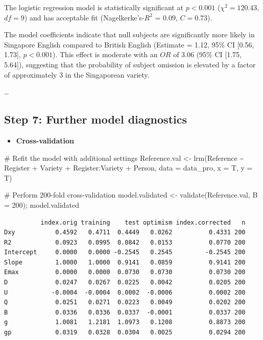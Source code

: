 \documentclass[
  11pt,
  letterpaper,
  DIV=11,
  numbers=noendperiod]{scrreprt}
\newenvironment{Shaded}{\begin{snugshade}}{\end{snugshade}}
\newcommand{\AttributeTok}[1]{\textcolor[rgb]{0.40,0.45,0.13}{#1}}
\newcommand{\CommentTok}[1]{\textcolor[rgb]{0.37,0.37,0.37}{#1}}
\newcommand{\DecValTok}[1]{\textcolor[rgb]{0.68,0.00,0.00}{#1}}
\newcommand{\FunctionTok}[1]{\textcolor[rgb]{0.28,0.35,0.67}{#1}}
\newcommand{\NormalTok}[1]{\textcolor[rgb]{0.00,0.23,0.31}{#1}}
\newcommand{\OtherTok}[1]{\textcolor[rgb]{0.00,0.23,0.31}{#1}}
\newcommand{\SpecialCharTok}[1]{\textcolor[rgb]{0.37,0.37,0.37}{#1}}
\providecommand{\tightlist}{%
  \setlength{\itemsep}{0pt}\setlength{\parskip}{0pt}}\usepackage{longtable,booktabs,array}
\begin{document}
The logistic regression model is statistically significant at
\(p < 0.001\) (\(\chi^2 = 120.43\), \(df = 9\)) and has acceptable fit
(Nagelkerke's-\(R^2\) = \(0.09\), \(C = 0.73\)).

The model coefficients indicate that null subjects are significantly
more likely in Singapore English compared to British English (Estimate =
1.12, 95\% CI {[}0.56, 1.73{]}, \(p < 0.001\)). This effect is moderate
with an \(OR\) of 3.06 (95\% CI {[}1.75, 5.64{]}), suggesting that the
probability of subject omission is elevated by a factor of approximately
3 in the Singaporean variety.

\ldots{}

\subsection{Step 7: Further model
diagnostics}\label{step-7-further-model-diagnostics}

\begin{itemize}
\tightlist
\item
  \textbf{Cross-validation}
\end{itemize}

\begin{Shaded}
\begin{Highlighting}[]
\CommentTok{\# Refit the model with additional settings}
\NormalTok{Reference.val }\OtherTok{\textless{}{-}} \FunctionTok{lrm}\NormalTok{(Reference }\SpecialCharTok{\textasciitilde{}}\NormalTok{ Register }\SpecialCharTok{+}\NormalTok{ Variety }\SpecialCharTok{+}\NormalTok{ Register}\SpecialCharTok{:}\NormalTok{Variety }\SpecialCharTok{+}\NormalTok{ Person, }\AttributeTok{data =}\NormalTok{ data\_pro, }\AttributeTok{x =}\NormalTok{ T, }\AttributeTok{y =}\NormalTok{ T)}

\CommentTok{\# Perform 200{-}fold cross{-}validation}
\NormalTok{model.validated }\OtherTok{\textless{}{-}} \FunctionTok{validate}\NormalTok{(Reference.val, }\AttributeTok{B =} \DecValTok{200}\NormalTok{); model.validated }
\end{Highlighting}
\end{Shaded}

\begin{verbatim}
          index.orig training    test optimism index.corrected   n
Dxy           0.4592   0.4711  0.4449   0.0262          0.4331 200
R2            0.0923   0.0995  0.0842   0.0153          0.0770 200
Intercept     0.0000   0.0000 -0.2545   0.2545         -0.2545 200
Slope         1.0000   1.0000  0.9141   0.0859          0.9141 200
Emax          0.0000   0.0000  0.0730   0.0730          0.0730 200
D             0.0247   0.0267  0.0225   0.0042          0.0205 200
U            -0.0004  -0.0004  0.0002  -0.0006          0.0002 200
Q             0.0251   0.0271  0.0223   0.0049          0.0202 200
B             0.0336   0.0336  0.0337  -0.0001          0.0337 200
g             1.0081   1.2181  1.0973   0.1208          0.8873 200
gp            0.0319   0.0328  0.0304   0.0025          0.0294 200
\end{verbatim}
\end{document}
